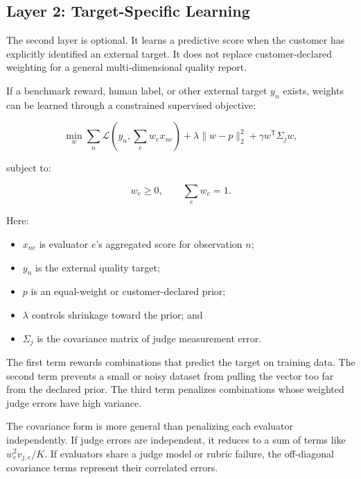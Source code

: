 \documentclass[11pt]{article}
\begin{document}
\subsection{Layer 2: Target-Specific Learning}

The second layer is optional. It learns a predictive score when the customer
has explicitly identified an external target. It does not replace
customer-declared weighting for a general multi-dimensional quality report.

If a benchmark reward, human label, or other external target \(y_n\) exists,
weights can be learned through a constrained supervised objective:

\begin{equation}
\min_{w}
\sum_n
\mathcal{L}
\left(
y_n,
\sum_e w_e x_{ne}
\right)
+ \lambda \lVert w-p \rVert_2^2
+ \gamma w^{\mathsf{T}}\Sigma_j w,
\end{equation}

subject to:

\begin{equation}
w_e \geq 0,
\qquad
\sum_e w_e = 1.
\end{equation}

Here:

\begin{itemize}
    \item \(x_{ne}\) is evaluator \(e\)'s aggregated score for observation
    \(n\);
    \item \(y_n\) is the external quality target;
    \item \(p\) is an equal-weight or customer-declared prior;
    \item \(\lambda\) controls shrinkage toward the prior; and
    \item \(\Sigma_j\) is the covariance matrix of judge measurement error.
\end{itemize}

The first term rewards combinations that predict the target on training data.
The second term prevents a small or noisy dataset from pulling the vector too
far from the declared prior. The third term penalizes combinations whose
weighted judge errors have high variance.

The covariance form is more general than penalizing each evaluator
independently. If judge errors are independent, it reduces to a sum of terms
like \(w_e^2 v_{j,e}/K\). If evaluators share a judge model or rubric failure,
the off-diagonal covariance terms represent their correlated errors.
\end{document}
